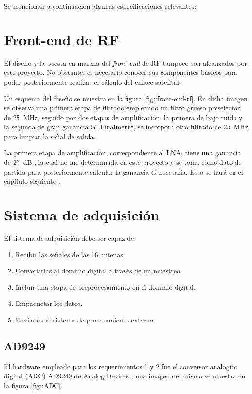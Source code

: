 \documentclass[../../main.tex]{subfiles}
\begin{document}
Se mencionan a continuación algunas especificaciones relevantes:



\section{Front-end de RF}
El diseño y la puesta en marcha del \textit{front-end} de RF tampoco son alcanzados por este proyecto. No obstante, es necesario conocer sus componentes básicos para poder posteriormente realizar el cálculo del enlace satelital. 

Un esquema del diseño se muestra en la figura \ref{fig::front-end-rf}. En dicha imagen se observa una primera etapa de filtrado empleando un filtro grueso preselector de 25~MHz, seguido por dos etapas de amplificación, la primera de bajo ruido y la segunda de gran ganancia $G$. Finalmente, se incorpora otro filtrado de 25~MHz para limpiar la señal de salida.

La primera etapa de amplificación, correspondiente al LNA, tiene una ganancia de 27~dB , la cual no fue determinada en este proyecto y se toma como dato de partida para posteriormente calcular la ganancia $G$ necesaria. Esto se hará en el capítulo siguiente .


\section{Sistema de adquisición}
El sistema de adquisición debe ser capaz de:
\begin{enumerate}
    \item Recibir las señales de las 16 antenas.
    \item Convertirlas al dominio digital a través de un muestreo.
    \item Incluir una etapa de preprocesamiento en el dominio digital.
    \item Empaquetar los datos.
    \item Enviarlos al sistema de procesamiento externo.
\end{enumerate}

\subsection{AD9249}
El hardware empleado para los requerimientos 1 y 2 fue el conversor analógico digital (ADC) AD9249 de Analog Devices \cite{AD9249}, una imagen del mismo se muestra en la figura \ref{fig::ADC}.
\end{document}
